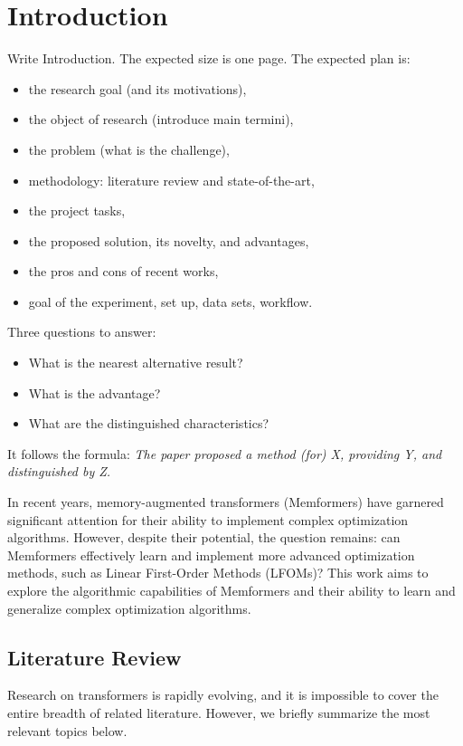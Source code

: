 \chapter{Introduction}
\label{sec:Chapter0} 

Write Introduction. The expected size is one page. The expected plan is:
\begin{itemize}
    \item the research goal (and its motivations),
    \item the object of research (introduce main termini),
    \item the problem (what is the challenge),
    \item methodology: literature review and state-of-the-art,
    \item the project tasks,
    \item the proposed solution, its novelty, and advantages,
    \item the pros and cons of recent works,
    \item goal of the experiment, set up, data sets, workflow.
\end{itemize}

Three questions to answer:
\begin{itemize}
    \item What is the nearest alternative result?
    \item What is the advantage?
    \item What are the distinguished characteristics?
\end{itemize}

It follows the formula:
\emph{The paper proposed a method (for) X, providing Y, and distinguished by Z.}

In recent years, memory-augmented transformers (Memformers) have garnered significant attention for their ability to implement complex optimization algorithms. However, despite their potential, the question remains: can Memformers effectively learn and implement more advanced optimization methods, such as Linear First-Order Methods (LFOMs)? This work aims to explore the algorithmic capabilities of Memformers and their ability to learn and generalize complex optimization algorithms.

\section{Literature Review}
Research on transformers is rapidly evolving, and it is impossible to cover the entire breadth of related literature. However, we briefly summarize the most relevant topics below.

